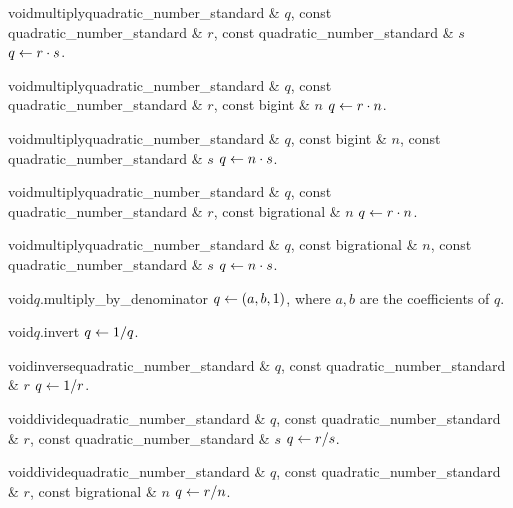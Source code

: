 \begin{fcode}{void}{multiply}{quadratic_number_standard & $q$, const quadratic_number_standard & $r$,
    const quadratic_number_standard & $s$}%
  $q \leftarrow r \cdot s$.
\end{fcode}

\begin{fcode}{void}{multiply}{quadratic_number_standard & $q$, const quadratic_number_standard & $r$,
    const bigint & $n$}%
  $q \leftarrow r \cdot n$.
\end{fcode}

\begin{fcode}{void}{multiply}{quadratic_number_standard & $q$, const bigint & $n$,
    const quadratic_number_standard & $s$}%
  $q \leftarrow n \cdot s$.
\end{fcode}

\begin{fcode}{void}{multiply}{quadratic_number_standard & $q$, const quadratic_number_standard & $r$,
    const bigrational & $n$}%
  $q \leftarrow r \cdot n$.
\end{fcode}

\begin{fcode}{void}{multiply}{quadratic_number_standard & $q$, const bigrational & $n$,
    const quadratic_number_standard & $s$}%
  $q \leftarrow n \cdot s$.
\end{fcode}

\begin{fcode}{void}{$q$.multiply_by_denominator}{}
  $q \leftarrow (a,b,1)$, where $a,b$ are the coefficients of $q$.
\end{fcode}

\begin{fcode}{void}{$q$.invert}{}
  $q \leftarrow 1 / q$.
\end{fcode}

\begin{fcode}{void}{inverse}{quadratic_number_standard & $q$, const quadratic_number_standard & $r$}
  $q \leftarrow 1 / r$.
\end{fcode}

\begin{fcode}{void}{divide}{quadratic_number_standard & $q$, const quadratic_number_standard & $r$,
    const quadratic_number_standard & $s$}%
  $q \leftarrow r / s$.
\end{fcode}

\begin{fcode}{void}{divide}{quadratic_number_standard & $q$, const quadratic_number_standard & $r$,
    const bigrational & $n$}%
  $q \leftarrow r / n$.
\end{fcode}

